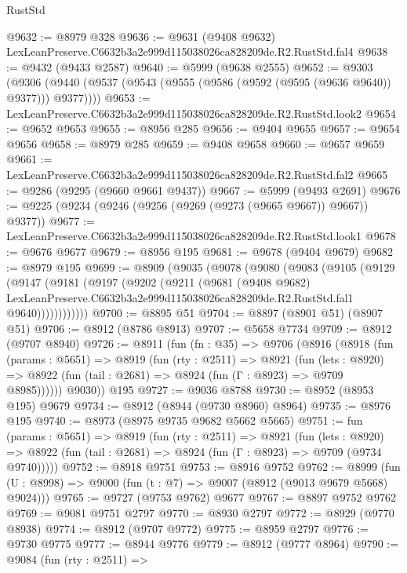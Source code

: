 \begin{lexlean}{RustStd}
\begin{coremodule}
@9632 := @8979 @328
@9636 := @9631 (@9408 @9632) LexLeanPreserve.C6632b3a2e999d115038026ca828209de.R2.RustStd.fal4
@9638 := @9432 (@9433 @2587)
@9640 := @5999 (@9638 @2555)
@9652 := @9303
    (@9306 (@9440 (@9537 (@9543 (@9555 (@9586 (@9592 (@9595 (@9636 @9640)) @9377))) @9377))))
@9653 := LexLeanPreserve.C6632b3a2e999d115038026ca828209de.R2.RustStd.look2
@9654 := @9652 @9653
@9655 := @8956 @285
@9656 := @9404 @9655
@9657 := @9654 @9656
@9658 := @8979 @285
@9659 := @9408 @9658
@9660 := @9657 @9659
@9661 := LexLeanPreserve.C6632b3a2e999d115038026ca828209de.R2.RustStd.fal2
@9665 := @9286 (@9295 (@9660 @9661 @9437))
@9667 := @5999 (@9493 @2691)
@9676 := @9225 (@9234 (@9246 (@9256 (@9269 (@9273 (@9665 @9667)) @9667)) @9377))
@9677 := LexLeanPreserve.C6632b3a2e999d115038026ca828209de.R2.RustStd.look1
@9678 := @9676 @9677
@9679 := @8956 @195
@9681 := @9678 (@9404 @9679)
@9682 := @8979 @195
@9699 := @8909
    (@9035
      (@9078
        (@9080
          (@9083
            (@9105
              (@9129
                (@9147
                  (@9181
                    (@9197
                      (@9202
                        (@9211
                          (@9681
                            (@9408 @9682)
                            LexLeanPreserve.C6632b3a2e999d115038026ca828209de.R2.RustStd.fal1
                            @9640))))))))))))
@9700 := @8895 @51
@9704 := @8897 (@8901 @51) (@8907 @51)
@9706 := @8912 (@8786 @8913)
@9707 := @5658 @7734
@9709 := @8912 (@9707 @8940)
@9726 := @8911
    (fun (fn : @35) =>
    @9706
      (@8916
        (@8918
          (fun (params : @5651) =>
          @8919
            (fun (rty : @2511) =>
            @8921
              (fun (lets : @8920) =>
              @8922 (fun (tail : @2681) => @8924 (fun (Γ : @8923) => @9709 @8985))))))
        @9030))
    @195
@9727 := @9036 @8788
@9730 := @8952 (@8953 @195) @9679
@9734 := @8912 (@8944 (@9730 @8960) @8964)
@9735 := @8976 @195
@9740 := @8973 (@8975 @9735 @9682 @5662 @5665)
@9751 := fun (params : @5651) =>
  @8919
    (fun (rty : @2511) =>
    @8921
      (fun (lets : @8920) =>
      @8922 (fun (tail : @2681) => @8924 (fun (Γ : @8923) => @9709 (@9734 @9740)))))
@9752 := @8918 @9751
@9753 := @8916 @9752
@9762 := @8999 (fun (U : @8998) => @9000 (fun (t : @7) => @9007 (@8912 (@9013 @9679 @5668) @9024)))
@9765 := @9727 (@9753 @9762) @9677
@9767 := @8897 @9752 @9762
@9769 := @9081 @9751 @2797
@9770 := @8930 @2797
@9772 := @8929 (@9770 @8938)
@9774 := @8912 (@9707 @9772)
@9775 := @8959 @2797
@9776 := @9730 @9775
@9777 := @8944 @9776
@9779 := @8912 (@9777 @8964)
@9790 := @9084
    (fun (rty : @2511) =>

\end{coremodule}
\end{lexlean}
